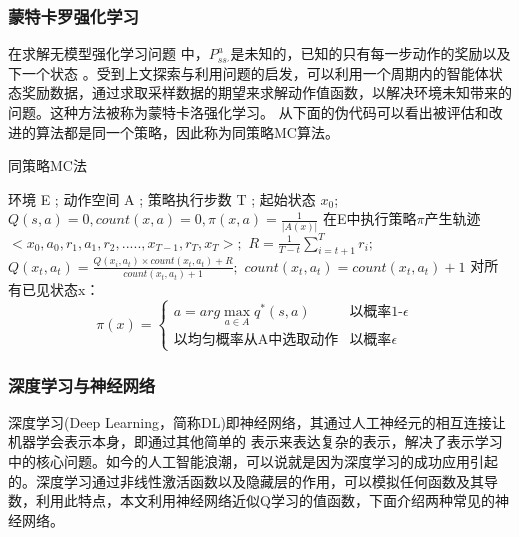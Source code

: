 \subsubsection{蒙特卡罗强化学习}
在求解无模型强化学习问题 中，$P_{ss_{'}}^a$是未知的，已知的只有每一步动作的奖励以及下一个状态
。受到上文探索与利用问题的启发，可以利用一个周期内的智能体状态奖励数据，通过求取采样数据的期望来求解动作值函数，以解决环境未知带来的问题。这种方法被称为蒙特卡洛强化学习。
从下面的伪代码可以看出被评估和改进的算法都是同一个策略，因此称为同策略MC算法。
\\
\begin{algorithm}[H]  
  \caption{同策略MC法}  
  \begin{algorithmic}[1] 
    \Require 环境 E ; 动作空间 A ;
    策略执行步数 T ; 起始状态 $x_0$;
    \Ensure 
    \State $Q(s,a)=0,count(x,a)=0,\pi(x,a)=\frac{1}{|A(x)|} $ 
    \State 在E中执行策略$\pi $产生轨迹
    \State $<x_0,a_0,r_1,a_1,r_2,.....,x_{T-1},r_T,x_T>;$
    \For{}
    \State$R=\frac{1}{T-t} \sum_{i=t+1}^{T}r_i ; $
    \State$Q(x_t,a_t)=\frac{Q(x_i,a_t)\times{count(x_t,a_t)}+R}{count(x_t,a_t)+1};$
    \State$count(x_t,a_t)=count(x_t,a_t)+1$
    \EndFor
    \State 对所有已见状态x：
    \State$$
    \pi (x)=\begin{cases}
      a=arg\max\limits_{a\in{A}} q^*(s,a)& \text{以概率1-$\epsilon$  }\\
      \text{以均匀概率从A中选取动作}& \text{以概率$\epsilon$ }
    \end{cases}
    $$
    \EndFor   
  \end{algorithmic}  
\end{algorithm}

\subsubsection{深度学习与神经网络}
深度学习(Deep Learning，简称DL)即神经网络，其通过人工神经元的相互连接让机器学会表示本身，即通过其他简单的
表示来表达复杂的表示，解决了表示学习中的核心问题。如今的人工智能浪潮，可以说就是因为深度学习的成功应用引起的。深度学习通过非线性激活函数以及隐藏层的作用，可以模拟任何函数及其导数，利用此特点，本文利用神经网络近似Q学习的值函数，下面介绍两种常见的神经网络。
